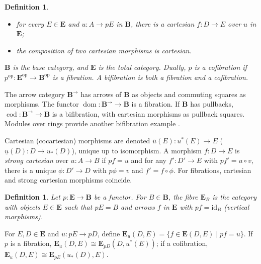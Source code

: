 \documentclass{article}
\theoremstyle{plain}
\newtheorem{definition}[theorem]{Definition}
\theoremstyle{remark}
\begin{document}
\begin{definition}
\begin{enumerate}
\begin{itemize}
            \item[(a)] for every $E \in \mathbf{E}$ and $u : A \to p E$ in $\mathbf{B}$, there is a cartesian $f : D \to E$ over $u$ in $\mathbf{E}$;
            \item[(b)] the composition of two cartesian morphisms is cartesian.
        \end{itemize}
        $\mathbf{B}$ is the \emph{base category}, and $\mathbf{E}$ is the \emph{total category}. Dually, $p$ is a \emph{cofibration} if $p^{\text{op}} : \mathbf{E}^{\text{op}} \to \mathbf{B}^{\text{op}}$ is a fibration. A \emph{bifibration} is both a fibration and a cofibration.
\end{enumerate}
\end{definition}

The arrow category $\mathbf{B}^{\to}$ has arrows of $\mathbf{B}$ as objects and commuting squares as morphisms. The functor $\operatorname{dom} : \mathbf{B}^{\to} \to \mathbf{B}$ is a fibration. If $\mathbf{B}$ has pullbacks, $\operatorname{cod} : \mathbf{B}^{\to} \to \mathbf{B}$ is a bifibration, with cartesian morphisms as pullback squares. Modules over rings provide another bifibration example \cite{Gray1966}.

Cartesian (cocartesian) morphisms are denoted $\bar{u}(E) : u^*(E) \to E$ ($\underline{u}(D) : D \to u_*(D)$), unique up to isomorphism. A morphism $f : D \to E$ is \emph{strong cartesian} over $u : A \to B$ if $p f = u$ and for any $f' : D' \to E$ with $p f' = u \circ v$, there is a unique $\phi : D' \to D$ with $p \phi = v$ and $f' = f \circ \phi$. For fibrations, cartesian and strong cartesian morphisms coincide.

\begin{definition}
\label{def:2.2}
Let $p : \mathbf{E} \to \mathbf{B}$ be a functor. For $B \in \mathbf{B}$, the \emph{fibre} $\mathbf{E}_B$ is the category with objects $E \in \mathbf{E}$ such that $p E = B$ and arrows $f$ in $\mathbf{E}$ with $p f = \text{id}_B$ (vertical morphisms).
\end{definition}

For $E, D \in \mathbf{E}$ and $u : p E \to p D$, define $\mathbf{E}_u(D, E) = \{ f \in \mathbf{E}(D, E) \mid p f = u \}$. If $p$ is a fibration, $\mathbf{E}_u(D, E) \cong \mathbf{E}_{p D}(D, u^*(E))$; if a cofibration, $\mathbf{E}_u(D, E) \cong \mathbf{E}_{p E}(u_*(D), E)$.
\end{document}
